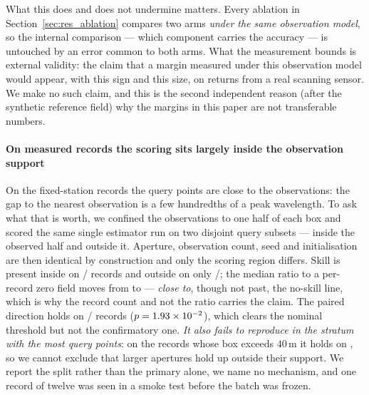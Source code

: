 \documentclass[review]{elsarticle}
\begin{document}
What this does and does not undermine matters. Every ablation in
Section~\ref{sec:res_ablation} compares two arms \emph{under the same observation
model}, so the internal comparison --- which component carries the accuracy --- is
untouched by an error common to both arms. What the measurement bounds is external
validity: the claim that a margin measured under this observation model would appear,
with this sign and this size, on returns from a real scanning sensor. We make no
such claim, and this is the second independent reason (after the synthetic reference
field) why the margins in this paper are not transferable numbers.

\paragraph{On measured records the scoring sits largely inside the observation support}
On the fixed-station records the query points are close to the observations: the
gap to the nearest observation is a few hundredths of a peak wavelength. To ask what
that is worth, we confined the observations to one half of each box and scored the
same single estimator run on two disjoint query subsets --- inside the observed half
and outside it. Aperture, observation count, seed and initialisation are then
identical by construction and only the scoring region differs. Skill is present
inside on \REightSkillIn{}/\REightN{} records and outside on only
\REightSkillOut{}/\REightN{}; the median ratio to a per-record zero field moves from
\REightRatioIn{} to \REightRatioOut{} --- \emph{close to}, though not past, the
no-skill line, which is why the record count and not the ratio carries the claim. The paired direction
holds on \REightBetter{}/\REightN{} records ($p = 1.93\times 10^{-2}{}$), which clears the
nominal threshold but not the confirmatory one. \emph{It also fails to reproduce in
the stratum with the most query points}: on the \REightBigN{} records whose box
exceeds $40$\,m it holds on \REightBigW{}, so we cannot exclude that larger apertures
hold up outside their support. We report the split rather than the primary alone, we
name no mechanism, and one record of twelve was seen in a smoke test before the batch
was frozen.

\end{document}
